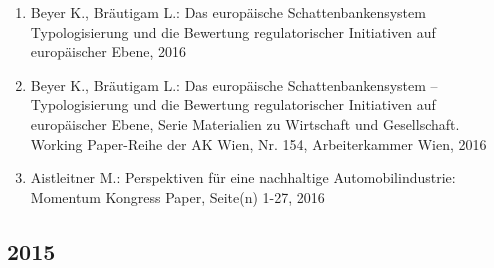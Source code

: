 \begin{enumerate}
	 \item Beyer K., Bräutigam L.: Das europäische Schattenbankensystem Typologisierung und die Bewertung regulatorischer Initiativen auf europäischer Ebene, 2016
	 \item Beyer K., Bräutigam L.: Das europäische Schattenbankensystem – Typologisierung und die Bewertung regulatorischer Initiativen auf europäischer Ebene, Serie Materialien zu Wirtschaft und Gesellschaft. Working Paper-Reihe der AK Wien, Nr. 154, Arbeiterkammer Wien, 2016
	 \item Aistleitner M.: Perspektiven für eine nachhaltige Automobilindustrie: Momentum Kongress Paper, Seite(n) 1-27, 2016
\end{enumerate}
\subsection*{2015}
